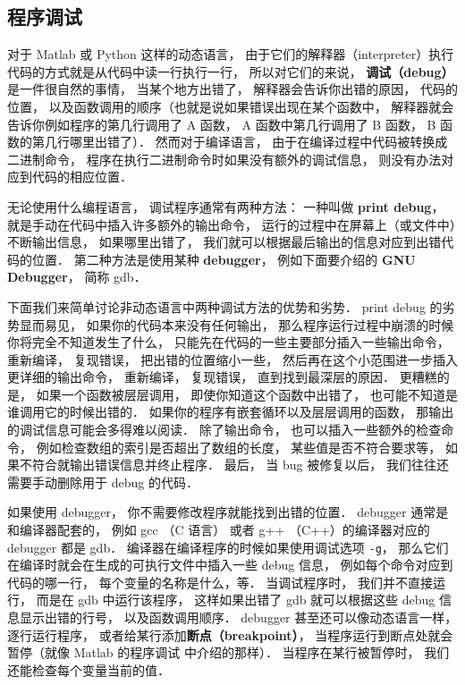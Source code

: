 
\subsection{程序调试}

对于 Matlab 或 Python 这样的动态语言， 由于它们的解释器（interpreter）执行代码的方式就是从代码中读一行执行一行， 所以对它们的来说， \textbf{调试（debug）}是一件很自然的事情， 当某个地方出错了， 解释器会告诉你出错的原因， 代码的位置， 以及函数调用的顺序（也就是说如果错误出现在某个函数中， 解释器就会告诉你例如程序的第几行调用了 A 函数， A 函数中第几行调用了 B 函数， B 函数的第几行哪里出错了）． 然而对于编译语言， 由于在编译过程中代码被转换成二进制命令， 程序在执行二进制命令时如果没有额外的调试信息， 则没有办法对应到代码的相应位置．

无论使用什么编程语言， 调试程序通常有两种方法： 一种叫做 \textbf{print debug}， 就是手动在代码中插入许多额外的输出命令， 运行的过程中在屏幕上（或文件中）不断输出信息， 如果哪里出错了， 我们就可以根据最后输出的信息对应到出错代码的位置． 第二种方法是使用某种 \textbf{debugger}， 例如下面要介绍的 \textbf{GNU Debugger}， 简称 gdb．

下面我们来简单讨论非动态语言中两种调试方法的优势和劣势． print debug 的劣势显而易见， 如果你的代码本来没有任何输出， 那么程序运行过程中崩溃的时候你将完全不知道发生了什么， 只能先在代码的一些主要部分插入一些输出命令， 重新编译， 复现错误， 把出错的位置缩小一些， 然后再在这个小范围进一步插入更详细的输出命令， 重新编译， 复现错误， 直到找到最深层的原因． 更糟糕的是， 如果一个函数被层层调用， 即使你知道这个函数中出错了， 也可能不知道是谁调用它的时候出错的． 如果你的程序有嵌套循环以及层层调用的函数， 那输出的调试信息可能会多得难以阅读． 除了输出命令， 也可以插入一些额外的检查命令， 例如检查数组的索引是否超出了数组的长度， 某些值是否不符合要求等， 如果不符合就输出错误信息并终止程序． 最后， 当 bug 被修复以后， 我们往往还需要手动删除用于 debug 的代码．

如果使用 debugger， 你不需要修改程序就能找到出错的位置． debugger 通常是和编译器配套的， 例如 gcc （C 语言） 或者 g++ （C++）的编译器对应的 debugger 都是 gdb． 编译器在编译程序的时候如果使用调试选项 \verb|-g|， 那么它们在编译时就会在生成的可执行文件中插入一些 debug 信息， 例如每个命令对应到代码的哪一行， 每个变量的名称是什么，等． 当调试程序时， 我们并不直接运行， 而是在 gdb 中运行该程序， 这样如果出错了 gdb 就可以根据这些 debug 信息显示出错的行号， 以及函数调用顺序． debugger 甚至还可以像动态语言一样， 逐行运行程序， 或者给某行添加\textbf{断点（breakpoint）}， 当程序运行到断点处就会暂停（就像 Matlab 的程序调试 中介绍的那样）． 当程序在某行被暂停时， 我们还能检查每个变量当前的值．

